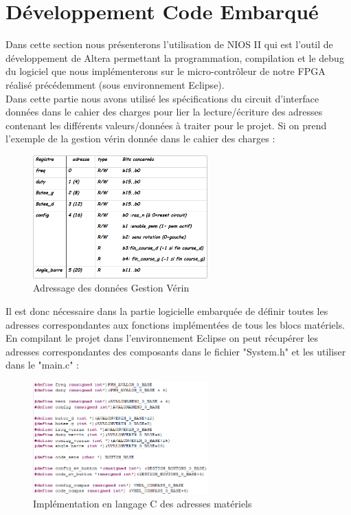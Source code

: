 \section{Développement Code Embarqué}
Dans cette section nous présenterons l'utilisation de NIOS II qui est l'outil de développement de Altera permettant la programmation, compilation et le debug du logiciel que nous implémenterons sur le micro-contrôleur de notre FPGA réalisé précédemment (sous environnement Eclipse).\\

Dans cette partie nous avons utilisé les spécifications du circuit d'interface données dans le cahier des charges pour lier la lecture/écriture des adresses contenant les différents valeurs/données à traiter pour le projet. Si on prend l'exemple de la gestion vérin donnée dans le cahier des charges :

\begin{figure}[h]
    \begin{center}
      \includegraphics[width=0.6\textwidth]{images/spec_verin.png}
      \caption{Adressage des données Gestion Vérin}
    \end{center}
  \end{figure}

  Il est donc nécessaire dans la partie logicielle embarquée de définir toutes les adresses correspondantes aux fonctions implémentées de tous les blocs matériels. En compilant le projet dans l'environnement Eclipse on peut récupérer les adresses correspondantes des composants dans le fichier "System.h" et les utiliser dans le "main.c" : 

  \begin{figure}[h]
    \begin{center}
      \includegraphics[width=0.6\textwidth]{images/def_spec.png}
      \caption{Implémentation en langage C des adresses matériels}
    \end{center}
  \end{figure}